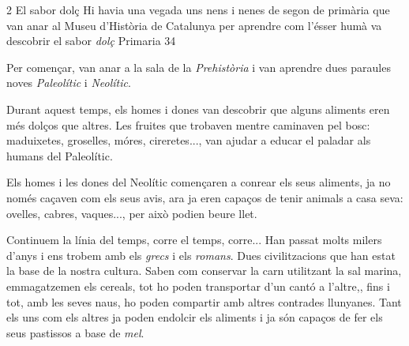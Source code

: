 \begin{news}
{2} %
{El sabor dolç}
{Hi havia una vegada uns nens i nenes de segon de primària que van anar al Museu d’Història de Catalunya per aprendre com l’ésser humà va descobrir el sabor \emph{dolç}}
{Primaria}
{34} %

\noindent{}

Per començar, van anar a la sala de la \emph{Prehistòria} i van aprendre dues paraules noves \emph{Paleolític} i \emph{Neolític}.

Durant aquest temps, els homes i dones van descobrir que alguns aliments eren més dolços que altres. Les fruites que trobaven mentre caminaven pel bosc: maduixetes, groselles, móres, cireretes..., van ajudar a educar el paladar als humans del Paleolític. 

Els homes i les dones del Neolític començaren a conrear els seus aliments, ja no només caçaven com els seus avis, ara ja eren  capaços de tenir animals a casa seva: ovelles, cabres, vaques..., per això podien beure llet.

Continuem la línia del temps, corre el temps, corre... Han passat molts milers d’anys i ens trobem amb els \emph{grecs} i els \emph{romans}. Dues civilitzacions que han estat la base de la nostra cultura. Saben com conservar la carn utilitzant la sal marina, emmagatzemen els cereals, tot ho poden transportar d’un cantó a l’altre,, fins i tot, amb les seves naus, ho poden compartir amb altres contrades llunyanes. Tant els uns com els altres ja poden endolcir els aliments i ja són capaços de fer els seus pastissos  a base de \emph{mel}.


\end{news}
